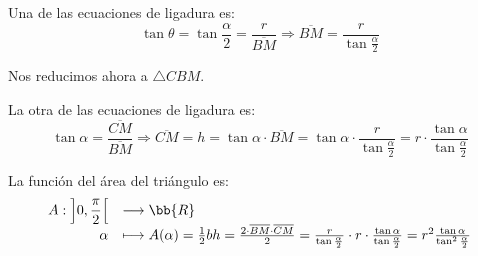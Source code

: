 \begin{ejercicio}
\begin{figure}[H]
    \end{figure}
    Una de las ecuaciones de ligadura es:
    \begin{equation*}
        \tan \theta = \tan \frac{\alpha}{2} = \frac{r}{\overline{BM}} \Longrightarrow \overline{BM} = \frac{r}{\tan \frac{\alpha}{2}}
    \end{equation*}

    Nos reducimos ahora a $\triangle CBM$.
    \begin{figure}[H]
        \centering
    \end{figure}
    La otra de las ecuaciones de ligadura es:
    \begin{equation*}
        \tan \alpha = \frac{\overline{CM}}{\overline{BM}} \Longrightarrow \overline{CM} = h =  \tan \alpha \cdot \overline{BM} = \tan \alpha  \cdot \frac{r}{\tan \frac{\alpha}{2}} = r \cdot \frac{\tan \alpha}{\tan \frac{\alpha}{2}}
    \end{equation*}
    
    La función del área del triángulo es:
    \begin{equation*}
        \begin{array}{rl}
            A:\displaystyle  \left]0,\frac{\pi}{2}\right[ & \longrightarrow \bb{R}\\
                    \alpha & \longmapsto A(\alpha)= \frac{1}{2}bh = \frac{2\cdot \overline{BM}\cdot \overline{CM}}{2} = \frac{r}{\tan \frac{\alpha}{2}} \cdot r \cdot \frac{\tan \alpha}{\tan \frac{\alpha}{2}} = r^2\frac{\tan \alpha}{\tan^2 \frac{\alpha}{2}}
        \end{array}
    \end{equation*}


\end{ejercicio}
